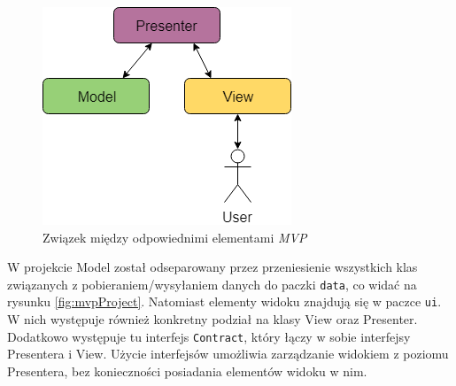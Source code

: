 \documentclass[twoside]{projektInzynierskiMS}
\begin{document}
\begin{figure}[h]
  \centering
  \includegraphics[width=0.5\linewidth]{img/android/mvp.png}
  \caption{Związek między odpowiednimi elementami \textit{MVP}}
  \label{fig:mvp}
\end{figure}

W projekcie Model został odseparowany przez przeniesienie wszystkich klas związanych z pobieraniem/wysyłaniem danych do paczki \verb`data`, co widać na rysunku \ref{fig:mvpProject}. Natomiast elementy widoku znajdują się w paczce \verb`ui`. W nich występuje również konkretny podział na klasy View oraz Presenter. Dodatkowo występuje tu interfejs \verb`Contract`, który łączy w sobie interfejsy Presentera i View. Użycie interfejsów umożliwia zarządzanie widokiem z poziomu Presentera, bez konieczności posiadania elementów widoku w nim. 
\end{document}
